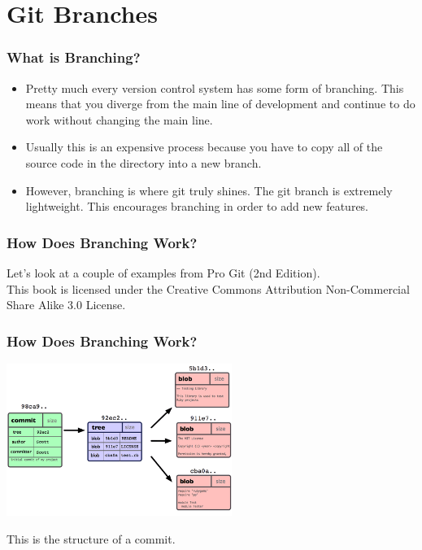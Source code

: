 
\section[Branching]{Git Branches}

\begin{frame}
\frametitle{\large What is Branching?}
\begin{itemize}
\item Pretty much every version control system has some form of branching. This means that you diverge from the main line of development and continue to do work without changing the main line.
\pause
\item Usually this is an expensive process because you have to copy all of the source code in the directory into a new branch.
\pause
\item However, branching is where git truly shines. The git branch is extremely lightweight. This encourages branching in order to add new features.
\end{itemize}
\end{frame}

\begin{frame}
\frametitle{\large How Does Branching Work?}
\begin{center}
Let's look at a couple of examples from Pro Git (2nd Edition). \\
This book is licensed under the Creative Commons Attribution Non-Commercial Share Alike 3.0 License.
\end{center}
\end{frame}

\begin{frame}
\frametitle{\large How Does Branching Work?}
\begin{center}
\includegraphics[width=0.55\textwidth]{img/branching_images/fig1.png}
\end{center}
\vspace{2mm}
\begin{center}
This is the structure of a commit.
\end{center}
\end{frame}

